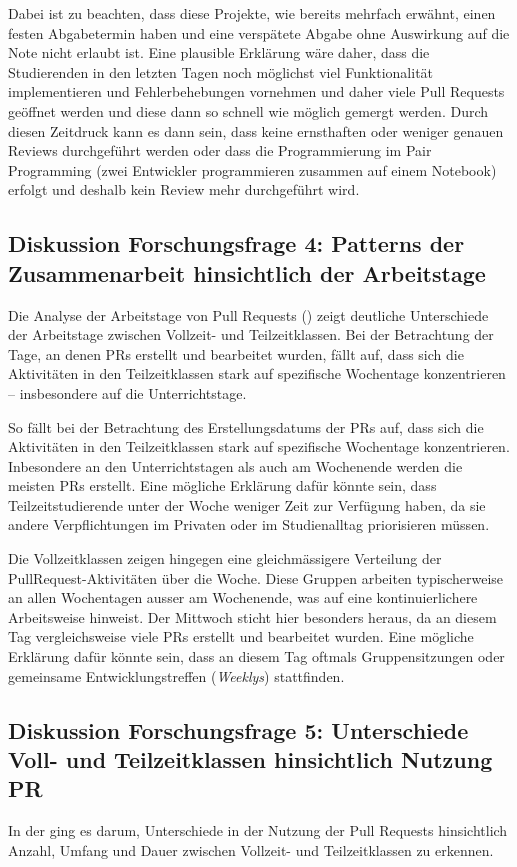 Dabei ist zu beachten, dass diese Projekte, wie bereits mehrfach erwähnt, einen festen Abgabetermin haben und eine verspätete Abgabe ohne Auswirkung auf die Note nicht erlaubt ist. Eine plausible Erklärung wäre daher, dass die Studierenden in den letzten Tagen noch möglichst viel Funktionalität implementieren und Fehlerbehebungen vornehmen und daher viele Pull Requests geöffnet werden und diese dann so schnell wie möglich gemergt werden. Durch diesen Zeitdruck kann es dann sein, dass keine ernsthaften oder weniger genauen Reviews durchgeführt werden oder dass die Programmierung im Pair Programming (zwei Entwickler programmieren zusammen auf einem Notebook) erfolgt und deshalb kein Review mehr durchgeführt wird. 

\subsection{Diskussion Forschungsfrage 4: Patterns der Zusammenarbeit hinsichtlich der Arbeitstage}
Die Analyse der Arbeitstage von Pull Requests () zeigt deutliche Unterschiede der Arbeitstage zwischen Vollzeit- und Teilzeitklassen. Bei der Betrachtung der Tage, an denen PRs erstellt und bearbeitet wurden, fällt auf, dass sich die Aktivitäten in den Teilzeitklassen stark auf spezifische Wochentage konzentrieren – insbesondere auf die Unterrichtstage. 

So fällt bei der Betrachtung des Erstellungsdatums der PRs auf, dass sich die Aktivitäten in den Teilzeitklassen stark auf spezifische Wochentage konzentrieren. Inbesondere an den Unterrichtstagen als auch am Wochenende werden die meisten PRs erstellt. Eine mögliche Erklärung dafür könnte sein, dass Teilzeitstudierende unter der Woche weniger Zeit zur Verfügung haben, da sie andere Verpflichtungen im Privaten oder im Studienalltag priorisieren müssen.

Die Vollzeitklassen zeigen hingegen eine gleichmässigere Verteilung der PullRequest-Aktivitäten über die Woche. Diese Gruppen arbeiten typischerweise an allen Wochentagen ausser am Wochenende, was auf eine kontinuierlichere Arbeitsweise hinweist. Der Mittwoch sticht hier besonders heraus, da an diesem Tag vergleichsweise viele PRs erstellt und bearbeitet wurden. Eine mögliche Erklärung dafür könnte sein, dass an diesem Tag oftmals Gruppensitzungen oder gemeinsame Entwicklungstreffen (\textit{Weeklys}) stattfinden.

\subsection{Diskussion Forschungsfrage 5: Unterschiede Voll- und Teilzeitklassen hinsichtlich Nutzung PR}
In der  ging es darum, Unterschiede in der Nutzung der Pull Requests hinsichtlich Anzahl, Umfang und Dauer zwischen Vollzeit- und Teilzeitklassen zu erkennen.

